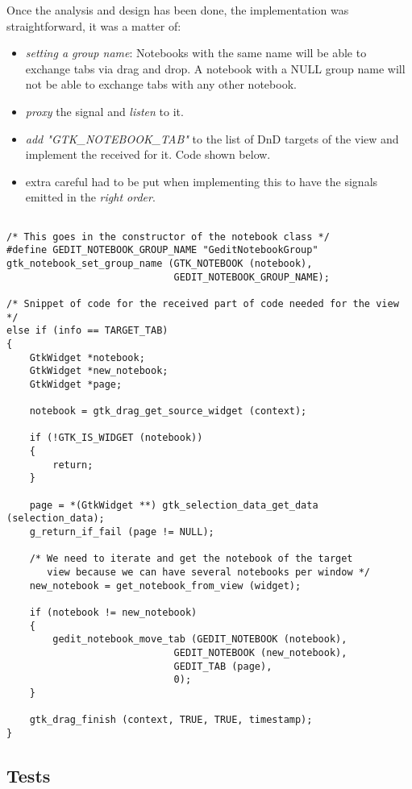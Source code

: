 Once the analysis and design has been done, the implementation was straightforward, it was a matter of:
\begin{itemize}
  \item \emph{setting a group name}: Notebooks with the same name will be able to exchange tabs via drag and drop. A notebook with a NULL group name will not be able to exchange tabs with any other notebook.
  \item \emph{proxy} the signal and \emph{listen} to it.
  \item \emph{add "GTK\_NOTEBOOK\_TAB"} to the list of DnD targets of the view and implement the received for it. Code shown below.
  \item extra careful had to be put when implementing this to have the signals emitted in the \emph{right order}.
\end{itemize}

\begin{lstlisting}[style=GObject]

/* This goes in the constructor of the notebook class */
#define GEDIT_NOTEBOOK_GROUP_NAME "GeditNotebookGroup"
gtk_notebook_set_group_name (GTK_NOTEBOOK (notebook),
                             GEDIT_NOTEBOOK_GROUP_NAME);

/* Snippet of code for the received part of code needed for the view */
else if (info == TARGET_TAB)
{
	GtkWidget *notebook;
	GtkWidget *new_notebook;
	GtkWidget *page;

	notebook = gtk_drag_get_source_widget (context);

	if (!GTK_IS_WIDGET (notebook))
	{
		return;
	}

	page = *(GtkWidget **) gtk_selection_data_get_data (selection_data);
	g_return_if_fail (page != NULL);

	/* We need to iterate and get the notebook of the target
	   view because we can have several notebooks per window */
	new_notebook = get_notebook_from_view (widget);

	if (notebook != new_notebook)
	{
		gedit_notebook_move_tab (GEDIT_NOTEBOOK (notebook),
			                 GEDIT_NOTEBOOK (new_notebook),
			                 GEDIT_TAB (page),
			                 0);
	}

	gtk_drag_finish (context, TRUE, TRUE, timestamp);
}

\end{lstlisting}

\subsection{Tests}

